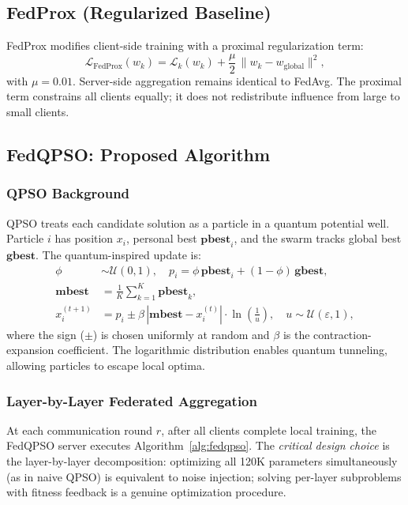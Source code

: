 \documentclass[conference]{IEEEtran}
\begin{document}
\subsection{FedProx (Regularized Baseline)}
FedProx \cite{li2020fedprox} modifies client-side training with a proximal
regularization term:
\begin{equation}
    \mathcal{L}_{\text{FedProx}}(w_k) = \mathcal{L}_k(w_k)
    + \frac{\mu}{2}\,\|w_k - w_{\text{global}}\|^2,
    \label{eq:fedprox}
\end{equation}
with $\mu = 0.01$. Server-side aggregation remains identical to FedAvg.
The proximal term constrains all clients equally; it does not redistribute
influence from large to small clients.

\subsection{FedQPSO: Proposed Algorithm}

\subsubsection{QPSO Background}
QPSO \cite{sun2004qpso} treats each candidate solution as a particle in a
quantum potential well. Particle $i$ has position $x_i$, personal best
$\mathbf{pbest}_i$, and the swarm tracks global best $\mathbf{gbest}$. The
quantum-inspired update is:
\begin{align}
    \phi &\sim \mathcal{U}(0,1), \quad
    p_i = \phi\,\mathbf{pbest}_i + (1-\phi)\,\mathbf{gbest},
    \label{eq:attractor}\\
    \mathbf{mbest} &= \frac{1}{K}\sum_{k=1}^{K}\mathbf{pbest}_k,
    \label{eq:mbest}\\
    x_i^{(t+1)} &= p_i \pm \beta\,|{\mathbf{mbest}} - x_i^{(t)}|
    \cdot \ln\!\left(\frac{1}{u}\right), \quad u \sim \mathcal{U}(\varepsilon,1),
    \label{eq:qpso_update}
\end{align}
where the sign ($\pm$) is chosen uniformly at random and $\beta$ is the
contraction-expansion coefficient. The logarithmic distribution enables
quantum tunneling, allowing particles to escape local optima.

\subsubsection{Layer-by-Layer Federated Aggregation}
At each communication round $r$, after all clients complete local training,
the FedQPSO server executes Algorithm~\ref{alg:fedqpso}. The \emph{critical
design choice} is the layer-by-layer decomposition: optimizing all 120K
parameters simultaneously (as in naive QPSO) is equivalent to noise injection;
solving per-layer subproblems with fitness feedback is a genuine optimization
procedure.
\end{document}
